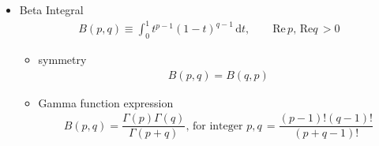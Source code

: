\begin{itemize}[topsep=2pt,itemsep=0pt]
    
    \item Beta Integral 
    \begin{align}
        B(p,q)\equiv \int_0^1 t^{p-1}(1-t)^{q-1}\,\mathrm{d}t,\qquad  \mathrm{Re}\,p,\,\mathrm{Re}q \,>0
    \end{align}
    \begin{itemize}[topsep=2pt,itemsep=0pt]
        \item symmetry
        \begin{align}
            B(p,q)=B(q,p) 
        \end{align}
        \item Gamma function expression
        \begin{align}
            B(p,q)=\dfrac{\Gamma (p)\Gamma (q)}{\Gamma (p+q)},\,\text{for integer }p,q \,=\dfrac{(p-1)!(q-1)!}{(p+q-1)!}
        \end{align}
        
    \end{itemize} 
    
    


 

\end{itemize}

    

